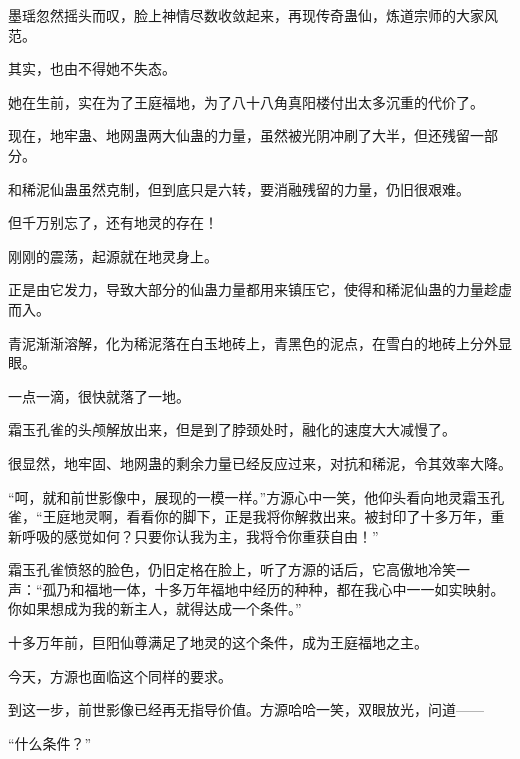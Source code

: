 \begin{this_body}
墨瑶忽然摇头而叹，脸上神情尽数收敛起来，再现传奇蛊仙，炼道宗师的大家风范。

其实，也由不得她不失态。

她在生前，实在为了王庭福地，为了八十八角真阳楼付出太多沉重的代价了。

现在，地牢蛊、地网蛊两大仙蛊的力量，虽然被光阴冲刷了大半，但还残留一部分。

和稀泥仙蛊虽然克制，但到底只是六转，要消融残留的力量，仍旧很艰难。

但千万别忘了，还有地灵的存在！

刚刚的震荡，起源就在地灵身上。

正是由它发力，导致大部分的仙蛊力量都用来镇压它，使得和稀泥仙蛊的力量趁虚而入。

青泥渐渐溶解，化为稀泥落在白玉地砖上，青黑色的泥点，在雪白的地砖上分外显眼。

一点一滴，很快就落了一地。

霜玉孔雀的头颅解放出来，但是到了脖颈处时，融化的速度大大减慢了。

很显然，地牢固、地网蛊的剩余力量已经反应过来，对抗和稀泥，令其效率大降。

“呵，就和前世影像中，展现的一模一样。”方源心中一笑，他仰头看向地灵霜玉孔雀，“王庭地灵啊，看看你的脚下，正是我将你解救出来。被封印了十多万年，重新呼吸的感觉如何？只要你认我为主，我将令你重获自由！”

霜玉孔雀愤怒的脸色，仍旧定格在脸上，听了方源的话后，它高傲地冷笑一声：“孤乃和福地一体，十多万年福地中经历的种种，都在我心中一一如实映射。你如果想成为我的新主人，就得达成一个条件。”

十多万年前，巨阳仙尊满足了地灵的这个条件，成为王庭福地之主。

今天，方源也面临这个同样的要求。

到这一步，前世影像已经再无指导价值。方源哈哈一笑，双眼放光，问道——

“什么条件？”

\end{this_body}

